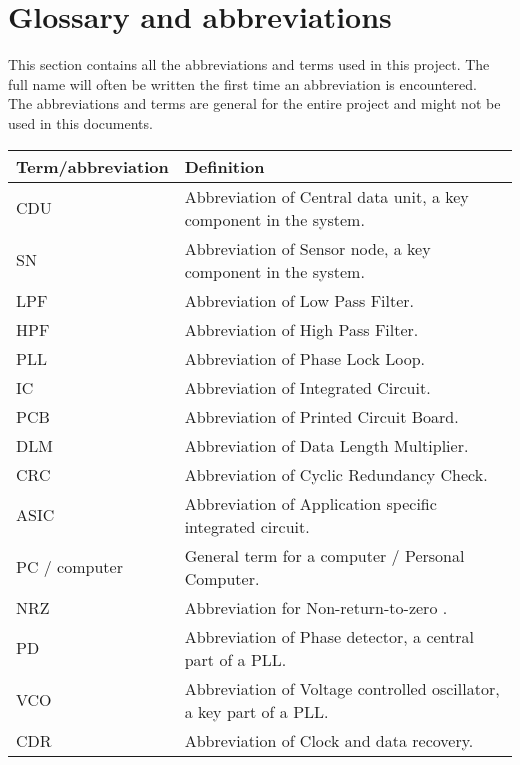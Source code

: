 \section{Glossary and abbreviations}
This section contains all the abbreviations and terms used in this project. The full name will often be written the first time an abbreviation is encountered.\\
The abbreviations and terms are general for the entire project and might not be used in this documents.
\begin{table}[H]
\centering
\begin{tabular}{|p{4cm}|p{7cm}|}
\hline
Term/abbreviation & Definition\\ \hline
CDU & Abbreviation of Central data unit, a key component in the system.\\ \hline
SN & Abbreviation of Sensor node, a key component in the system.\\ \hline
LPF & Abbreviation of Low Pass Filter. \\ \hline
HPF & Abbreviation of High Pass Filter. \\ \hline
PLL & Abbreviation of Phase Lock Loop. \\ \hline
IC & Abbreviation of Integrated Circuit. \\ \hline
PCB & Abbreviation of Printed Circuit Board. \\ \hline
DLM & Abbreviation of Data Length Multiplier. \\ \hline
CRC & Abbreviation of Cyclic Redundancy Check. \\ \hline
ASIC & Abbreviation of Application specific integrated circuit.\\ \hline
PC / computer & General term for a computer / Personal Computer.\\ \hline
NRZ & Abbreviation for Non-return-to-zero .\\ \hline
PD & Abbreviation of Phase detector, a central part of a PLL.\\ \hline
VCO & Abbreviation of Voltage controlled oscillator, a key part of a PLL.\\ \hline
CDR & Abbreviation of Clock and data recovery. \\ \hline
\end{tabular}
\end{table}